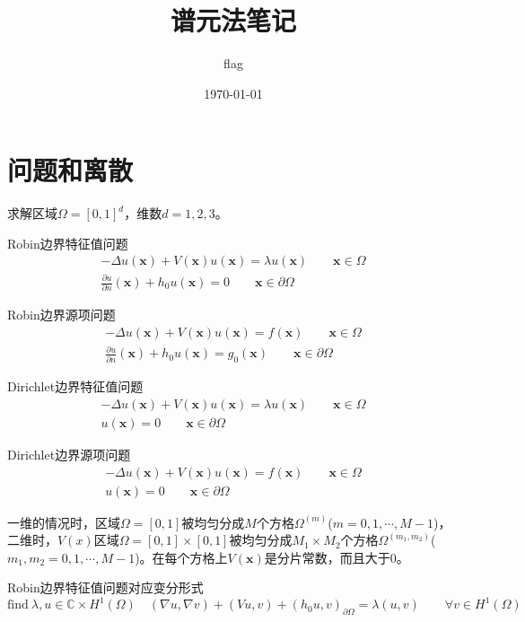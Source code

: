 \documentclass[UTF8,12pt]{article}
\title{谱元法笔记}
\author{flag}
\date{\today}
\begin{document}
\maketitle

\section{问题和离散}

求解区域$\Omega = [0,1]^d$，维数$d = 1, 2, 3$。

Robin边界特征值问题
\begin{eqnarray}
- \Delta u(\mathbf{x}) + V(\mathbf{x}) u(\mathbf{x}) = \lambda u(\mathbf{x}) \qquad \mathbf{x} \in \Omega \\
\frac{\partial u}{\partial n}(\mathbf{x}) + h_0 u(\mathbf{x}) = 0 \qquad \mathbf{x} \in \partial \Omega
\end{eqnarray}

Robin边界源项问题
\begin{eqnarray}
- \Delta u(\mathbf{x}) + V(\mathbf{x}) u(\mathbf{x}) = f(\mathbf{x}) \qquad \mathbf{x} \in \Omega \\
\frac{\partial u}{\partial n}(\mathbf{x}) + h_0 u(\mathbf{x}) = g_0(\mathbf{x}) \qquad \mathbf{x} \in \partial \Omega
\end{eqnarray}

Dirichlet边界特征值问题
\begin{eqnarray}
- \Delta u(\mathbf{x}) + V(\mathbf{x}) u(\mathbf{x}) = \lambda u(\mathbf{x}) \qquad \mathbf{x} \in \Omega \\
u(\mathbf{x}) = 0 \qquad \mathbf{x} \in \partial \Omega
\end{eqnarray}

Dirichlet边界源项问题
\begin{eqnarray}
- \Delta u(\mathbf{x}) + V(\mathbf{x}) u(\mathbf{x}) = f(\mathbf{x}) \qquad \mathbf{x} \in \Omega \\
u(\mathbf{x}) = 0 \qquad \mathbf{x} \in \partial \Omega
\end{eqnarray}

一维的情况时，区域$\Omega=[0,1]$被均匀分成$M$个方格$\Omega^{(m)}$($m = 0, 1, \cdots, M-1$)，二维时，$V(x)$区域$\Omega=[0,1] \times [0,1]$被均匀分成$M_1 \times M_2$个方格$\Omega^{(m_1, m_2)}$($m_1, m_2 = 0, 1, \cdots, M-1$)。在每个方格上$V(\mathbf{x})$是分片常数，而且大于0。

Robin边界特征值问题对应变分形式
\begin{equation}
\text{find} \ \lambda, u \in \mathbb{C} \times H^1(\Omega) \quad (\nabla u, \nabla v) + (V u, v) + (h_0 u, v)_{\partial\Omega} = \lambda (u, v) \qquad \forall v \in  H^1(\Omega)
\end{equation}
\end{document}
